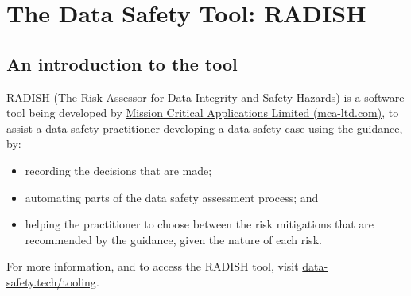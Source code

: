 %
%
\chapter{The Data Safety Tool: RADISH} \label{bkm:radish}

\section{An introduction to the tool}
RADISH (The Risk Assessor for Data Integrity and Safety Hazards) is a software tool being developed by \href{https://mca-ltd.com/}{Mission Critical Applications Limited (mca-ltd.com)}, to assist a data safety practitioner developing a data safety case using the guidance, by:
\begin{itemize}
  \item recording the decisions that are made;
  \item automating parts of the \gls{data safety assessment} process; and
  \item helping the practitioner to choose between the risk mitigations that are recommended by the guidance, given the nature of each risk.
\end{itemize}

For more information, and to access the RADISH tool, visit \href{https://data-safety.tech/tooling}{data-safety.tech/tooling}.

